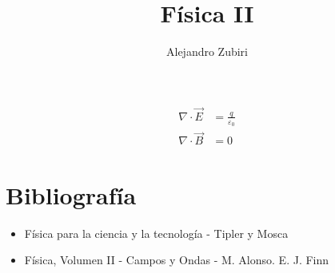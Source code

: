 \documentclass{report}
\author{Alejandro Zubiri}
\title{Física II}
\begin{document}
\maketitle
\begin{equation}
	\begin{split}
		\nabla \cdot \vec{E} &= \frac{q}{\varepsilon_{0}}\\
		\nabla \cdot \vec{B} &= 0
	\end{split}
\end{equation}
\pagebreak
\tableofcontents
\pagebreak
\section{Bibliografía}
\begin{itemize}
	\item Física para la ciencia y la tecnología - Tipler y Mosca
	\item Física, Volumen II - Campos y Ondas - M. Alonso. E. J. Finn
\end{itemize}



\end{document}
